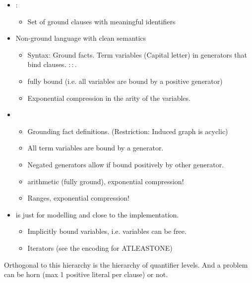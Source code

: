 \documentclass[conference]{IEEEtran}
\begin{document}
\begin{itemize}
    \item \bflat: 
        \begin{itemize}
            \item Set of ground clauses with meaningful identifiers 
        \end{itemize}
    \item \bcore Non-ground language with clean semantics
        \begin{itemize}
            \item Syntax: Ground facts. Term variables (Capital letter) in generators that bind clauses. $::$.
            \item fully bound (i.e. all variables are bound by a positive generator) 
            \item Exponential compression in the arity of the variables. 
        \end{itemize}
    \item \bfull 
        \begin{itemize}
            \item Grounding fact definitions. (Restriction: Induced graph is acyclic)
            \item All term variables are bound by a generator. 
            \item Negated generators allow if bound positively by other generator. 
            \item arithmetic (fully ground), exponential compression!
            \item Ranges, exponential compression!
        \end{itemize}
    \item \bnice is just for modelling and close to the implementation. 
        \begin{itemize}
            \item Implicitly bound variables, i.e. variables can be free. 
            \item Iterators (see the encoding for ATLEASTONE)
        \end{itemize}
\end{itemize}

Orthogonal to this hierarchy is the hierarchy of quantifier levels. 
And a problem can be horn (max 1 positive literal per clause) or not. 

\subsection{\bflat}
\end{document}
